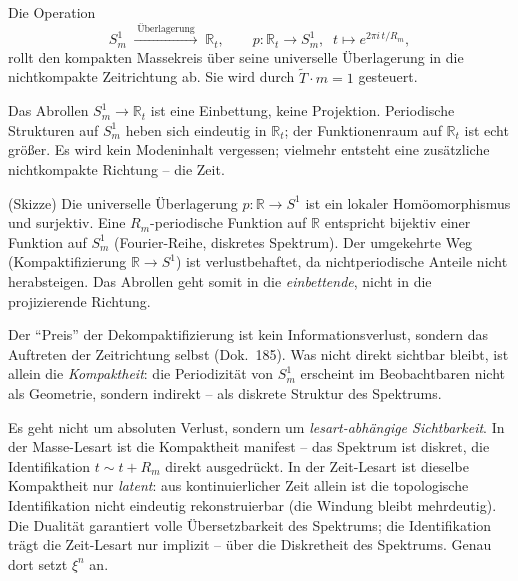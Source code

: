 \begin{definition}\label{def:typeI}
Die Operation
\[
  S^1_m \;\xrightarrow{\;\text{\"Uberlagerung}\;}\; \mathbb{R}_t,
  \qquad p:\mathbb{R}_t \to S^1_m,\;\; t \mapsto e^{2\pi i\, t / R_m},
\]
rollt den kompakten Massekreis \"uber seine universelle \"Uberlagerung in die
nichtkompakte Zeitrichtung ab. Sie wird durch $\tilde{T}\cdot m = 1$ gesteuert.
\end{definition}

\begin{theorem}\label{satz:typeI}
Das Abrollen $S^1_m \to \mathbb{R}_t$ ist eine Einbettung, keine Projektion.
Periodische Strukturen auf $S^1_m$ heben sich eindeutig in $\mathbb{R}_t$; der
Funktionenraum auf $\mathbb{R}_t$ ist echt gr\"o\ss er. Es wird kein Modeninhalt
vergessen; vielmehr entsteht eine zus\"atzliche nichtkompakte Richtung -- die
Zeit.
\end{theorem}

\begin{beweis}
(Skizze) Die universelle \"Uberlagerung $p:\mathbb{R}\to S^1$ ist ein lokaler
Hom\"oomorphismus und surjektiv. Eine $R_m$-periodische Funktion auf $\mathbb{R}$
entspricht bijektiv einer Funktion auf $S^1_m$ (Fourier-Reihe, diskretes
Spektrum). Der umgekehrte Weg (Kompaktifizierung $\mathbb{R}\to S^1$) ist
verlustbehaftet, da nichtperiodische Anteile nicht herabsteigen. Das Abrollen
geht somit in die \emph{einbettende}, nicht in die projizierende Richtung.
\end{beweis}

\begin{corollary}
Der ``Preis'' der Dekompaktifizierung ist kein Informationsverlust, sondern das
Auftreten der Zeitrichtung selbst (Dok.~185). Was nicht direkt sichtbar bleibt,
ist allein die \emph{Kompaktheit}: die Periodizit\"at von $S^1_m$ erscheint im
Beobachtbaren nicht als Geometrie, sondern indirekt -- als diskrete Struktur des
Spektrums.
\end{corollary}

\begin{remark}\label{bem:residual}
Es geht nicht um absoluten Verlust, sondern um \emph{lesart-abh\"angige
Sichtbarkeit}. In der Masse-Lesart ist die Kompaktheit manifest -- das Spektrum
ist diskret, die Identifikation $t \sim t + R_m$ direkt ausgedr\"uckt. In der
Zeit-Lesart ist dieselbe Kompaktheit nur \emph{latent}: aus kontinuierlicher
Zeit allein ist die topologische Identifikation nicht eindeutig
rekonstruierbar (die Windung bleibt mehrdeutig). Die Dualit\"at garantiert volle
\"Ubersetzbarkeit des Spektrums; die Identifikation tr\"agt die Zeit-Lesart nur
implizit -- \"uber die Diskretheit des Spektrums. Genau dort setzt $\xi^n$ an.
\end{remark}


